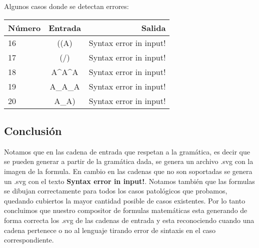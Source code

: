Algunos casos donde se detectan errores:

\begin{center}
  \begin{tabular}{ l | c || r }
    \hline
    N\'umero & Entrada & Salida \\ \hline
    16 & ((A) & Syntax error in input! \\ \hline
    17 & (/) & Syntax error in input! \\ \hline
    18 & A\^{}A\^{}A & Syntax error in input! \\ \hline
    19 & A\_A\_A & Syntax error in input! \\ \hline
    20 & A\_A) & Syntax error in input! \\ \hline

    

  \end{tabular}
\end{center}
\subsection{Conclusi\'on}

Notamos que en las cadena de entrada que respetan a la gram\'atica, es decir que se pueden generar a partir de la gram\'atica dada, se genera un archivo .svg con la imagen de la formula. En cambio en las cadenas que no son soportadas se genera un .svg con el texto \textbf{Syntax error in input!}. 
Notamos tambi\'en que las formulas se dibujan correctamente para todos los casos patol\'ogicos que probamos, quedando cubiertos la mayor cantidad posible de casos existentes. 
Por lo tanto concluimos que nuestro compositor de formulas matem\'aticas esta generando de forma correcta los .svg de las cadenas de entrada y esta reconociendo cuando una cadena pertenece o no al lenguaje tirando error de sintaxis en el caso correspondiente.